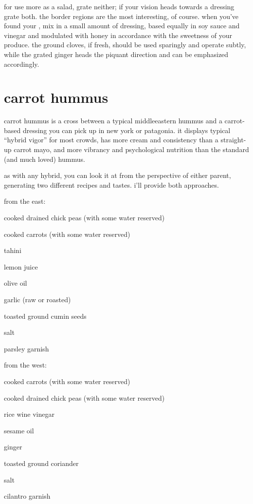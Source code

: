for use more as a salad, grate neither; if your vision heads towards a
dressing grate both. the border regions are the most interesting, of
course. when you've found your , mix in a small amount of
dressing, based equally in soy sauce and vinegar and modulated with
honey in accordance with the sweetness of your produce. the ground
cloves, if fresh, should be used sparingly and operate subtly, while
the grated ginger heads the piquant direction and can be emphasized
accordingly.

\section{carrot hummus}

carrot hummus is a cross between a typical middleeastern hummus and a
carrot-based dressing you can pick up in new york or patagonia. it
displays typical ``hybrid vigor'' for most crowds, has more cream and
consistency than a straight-up carrot mayo, and more vibrancy and
psychological nutrition than the standard (and much loved) hummus.

as with any hybrid, you can look it at from the perspective of either
parent, generating two different recipes and tastes. i'll provide both
approaches.

from the east:

\begin{ingredients}
  \item cooked drained chick peas (with some water reserved)
  \item cooked carrots (with some water reserved)
  \item tahini
  \item lemon juice
  \item olive oil
  \item garlic (raw or roasted)
  \item toasted ground cumin seeds
  \item salt
  \item parsley garnish
\end{ingredients}

from the west:

\begin{ingredients}
  \item cooked carrots (with some water reserved)
  \item cooked drained chick peas (with some water reserved)
  \item rice wine vinegar
  \item sesame oil
  \item ginger
  \item toasted ground coriander
  \item salt
  \item cilantro garnish
\end{ingredients}

